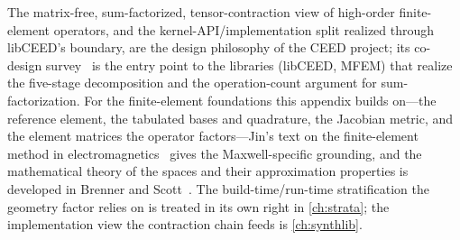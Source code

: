 \furtherreading
The matrix-free, sum-factorized, tensor-contraction view of high-order
finite-element operators, and the kernel-API/implementation split realized through
libCEED's  boundary, are the design philosophy of the CEED project;
its co-design survey~\citep{ceed2021} is the entry point to the libraries (libCEED,
MFEM) that realize the five-stage decomposition and the operation-count argument for
sum-factorization. For the finite-element foundations this appendix builds on---the
reference element, the tabulated bases and quadrature, the Jacobian metric, and the
element matrices the operator factors---Jin's text on the finite-element method in
electromagnetics~\citep{jin2014} gives the Maxwell-specific grounding, and the
mathematical theory of the spaces and their approximation properties is developed in
Brenner and Scott~\citep{brennerscott2008}. The build-time/run-time stratification
the geometry factor relies on is treated in its own right in \cref{ch:strata}; the
implementation view the contraction chain feeds is \cref{ch:synthlib}.
